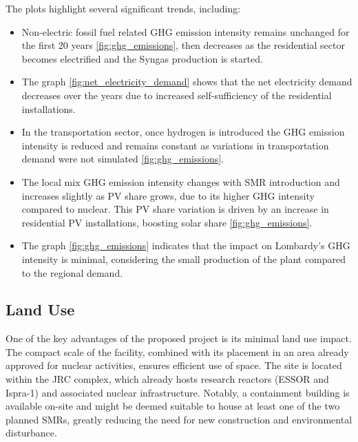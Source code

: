 The plots highlight several significant trends, including:
\begin{itemize}
\item Non-electric fossil fuel related GHG emission intensity remains unchanged for the first 20 years \ref{fig:ghg_emissions}, then decreases as the residential sector becomes electrified and the Syngas production is started.
\item The graph \ref{fig:net_electricity_demand} shows that the net electricity demand decreases over the years due to increased self-sufficiency of the residential installations.
\item In the transportation sector, once hydrogen is introduced the GHG emission intensity is reduced and remains constant as variations in transportation demand were not simulated \ref{fig:ghg_emissions}.
\item The local mix GHG emission intensity changes with SMR introduction and increases slightly as PV share grows, due to its higher GHG intensity compared to nuclear. This PV share variation is driven by an increase in residential PV installations, boosting solar share \ref{fig:ghg_emissions}.
\item The graph \ref{fig:ghg_emissions} indicates that the impact on Lombardy's GHG intensity is minimal, considering the small production of the plant compared to the regional demand.
\end{itemize}

\subsection{Land Use}
One of the key advantages of the proposed project is its minimal land use impact. The compact scale of the facility, combined with its placement in an area already approved for nuclear activities, ensures efficient use of space. The site is located within the JRC complex, which already hosts research reactors (ESSOR and Ispra-1) and associated nuclear infrastructure. Notably, a containment building is available on-site and might be deemed suitable to house at least one of the two planned SMRs, greatly reducing the need for new construction and environmental disturbance.